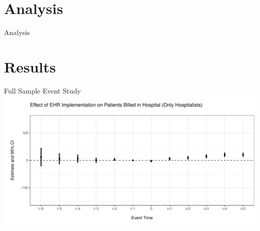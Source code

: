 \documentclass[10pt]{beamer}
\begin{document}
\section{Analysis}

\begin{frame}{Analysis}


    
\end{frame}

\section{Results}

\begin{frame}{Full Sample Event Study}
\centering
\includegraphics[scale=.7]{Objects/event_hosp_fullsample.pdf}
    
\end{frame}
\end{document}

